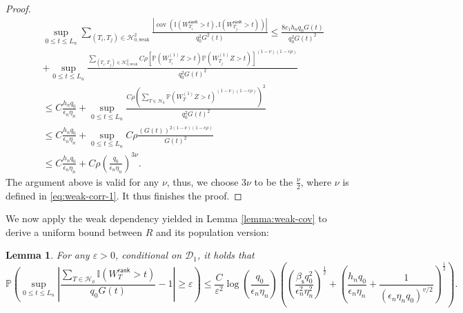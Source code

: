 \documentclass[12pt]{article}
\newcommand{\abs}[1]{\left\lvert#1\right\rvert}
\newcommand{\PP}{\mathbb{P}}
\newcommand{\cH}{\mathcal{H}}
\newcommand{\cD}{\mathcal{D}}
\newcommand{\bbI}{\mathbb{I}}
\def\PP{{\mathbb P}}
\newtheorem{Lemma}{Lemma}
\theoremstyle{plain}
\begin{document}
\begin{proof}
\begin{equation*}
\begin{aligned}
       &\sup_{0\le t\le L_n } \sum_{(T_i,T_j)\in \cH_{0,\text{weak} }^2 }\frac{ \abs{\operatorname{cov}(\bbI(W_{T_i}^{\mathsf{rank} }>t),\bbI(W_{T_j}^{\mathsf{rank} }>t)) }}{q_0^2 G^2(t)}\le  \frac{8c_1 h_n q_0 G(t)  }{q_0^2 G(t)^2} \\
       & +\sup_{0\le t\le L_n }\frac{ \sum_{(T_i,T_j)\in\cH_{0,\text{weak}} ^2 } C\rho \left[\PP({W}^{(1)}_{T_i} Z >t )\PP({W}^{(1)}_{T_j} Z>t)\right]^{(1-\nu)(1-c\rho) }  }{q_0^2 G(t)^2}\\
       & \le  C \frac{h_n q_0}{\epsilon_n \eta_n } + \sup_{0\le t\le L_n }\frac{ C\rho \left(\sum_{T\in \cH_0 }\PP({W}^{(1)}_{T} Z >t )^{(1-\nu)(1-c\rho) }\right)^2  }{q_0^2 G(t)^2} \\ 
       & \le  C \frac{h_n q_0}{\epsilon_n \eta_n } + \sup_{0\le t\le L_n }C\rho \frac{ \left( G(t) \right)^{2(1-\nu)(1-c\rho) }  }{ G(t)^2} \\
       & \le  C \frac{h_n q_0}{\epsilon_n \eta_n } +C {\rho}( \frac{q_0}{\epsilon_n\eta_n})^{3\nu}.
\end{aligned}
\end{equation*}
The argument above is valid for any $\nu$, thus, we choose $3\nu$ to be the $\frac{\nu}{2}$, where $\nu$ is defined in \eqref{eq:weak-corr-1}. It thus finishes the proof.
\end{proof}
We now apply the weak dependency yielded in Lemma \ref{lemma:weak-cov} to derive a uniform bound between $R$ and its population version: 

\begin{Lemma}\label{lemma:conv-prob}
For any $\varepsilon>0$, conditional on $\cD_1$, it holds that
\begin{equation*}
   \PP\left(\sup\limits_{0\le t\le L_n}\abs{\frac{ \sum_{T\in\cH_0}\bbI(W_T^{\mathsf{rank} }>t ) }{q_0 G(t) } -1} \ge \varepsilon\right) \le \frac{C}{\varepsilon^2} \log(\frac{q_0 }{\epsilon_n \eta_n}) \left( \left(\frac{\beta_{\mathsf{s}} q_0^2 }{ \epsilon_n^2\eta_n^2}\right)^{\frac{1}{2}} + \left(\frac{h_n q_0}{\epsilon_n \eta_n}+ \frac{1}{ \left(\epsilon_n\eta_n q_0\right)^{v/2} } \right)^{\frac{1}{2}}\right) .
\end{equation*}
\end{Lemma}
\end{document}
